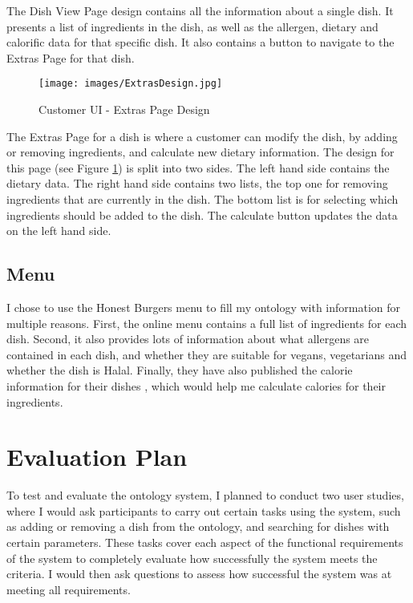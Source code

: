 The Dish View Page design contains all the information about a single dish. It presents a list of ingredients in the dish, as well as the allergen, dietary and calorific data for that specific dish. It also contains a button to navigate to the Extras Page for that dish.

\begin{figure}[h]
    \centering
    \captionsetup{justification=centering}
    \texttt{[image: images/ExtrasDesign.jpg]}
    \caption{Customer UI - Extras Page Design}
    \label{fig:customerUI_extras_design}
\end{figure}

The Extras Page for a dish is where a customer can modify the dish, by adding or removing ingredients, and calculate new dietary information. The design for this page (see Figure \ref{fig:customerUI_extras_design}) is split into two sides. The left hand side contains the dietary data. The right hand side contains two lists, the top one for removing ingredients that are currently in the dish. The bottom list is for selecting which ingredients should be added to the dish. The calculate button updates the data on the left hand side.

\subsection{Menu}

I chose to use the Honest Burgers \cite{honest_burgers_2023} menu to fill my ontology with information for multiple reasons. First, the online menu contains a full list of ingredients for each dish. Second, it also provides lots of information about what allergens are contained in each dish, and whether they are suitable for vegans, vegetarians and whether the dish is Halal. Finally, they have also published the calorie information for their dishes \cite{honest_burgers_nutritional_2022}, which would help me calculate calories for their ingredients.

\section{Evaluation Plan}

To test and evaluate the ontology system, I planned to conduct two user studies, where I would ask participants to carry out certain tasks using the system, such as adding or removing a dish from the ontology, and searching for dishes with certain parameters. These tasks cover each aspect of the functional requirements of the system to completely evaluate how successfully the system meets the criteria. I would then ask questions to assess how successful the system was at meeting all requirements.

